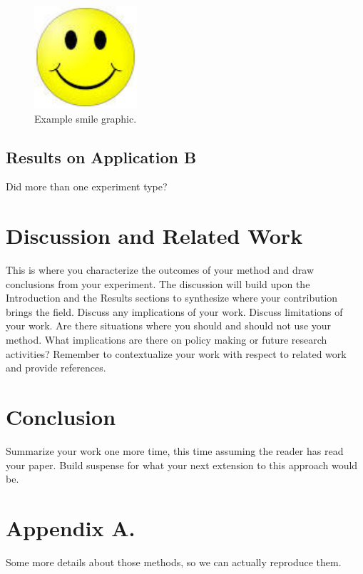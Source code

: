\documentclass[twoside,11pt]{article}
\begin{document}
\begin{figure}[htbp]
  \centering 
  \includegraphics[width=1.5in]{smile.jpeg} 
  \caption{Example smile graphic.}
  \label{fig:example} 
\end{figure} 

\subsection{Results on Application B} 

Did more than one experiment type?

\section{Discussion and Related Work} 

This is where you characterize the outcomes of your method and draw conclusions from your experiment.
The discussion will build upon the Introduction and the Results sections to synthesize where your contribution brings the field. Discuss any implications of your work. 
Discuss limitations of your work.
Are there situations where you should and should not use your method.
What implications are there on policy making or future research activities?
Remember to contextualize your work with respect to related work and provide references.

\section{Conclusion} 
Summarize your work one more time, this time assuming the reader has read your paper.
Build suspense for what your next extension to this approach would be.




\appendix
\section*{Appendix A.}
Some more details about those methods, so we can actually reproduce them.
\end{document}
